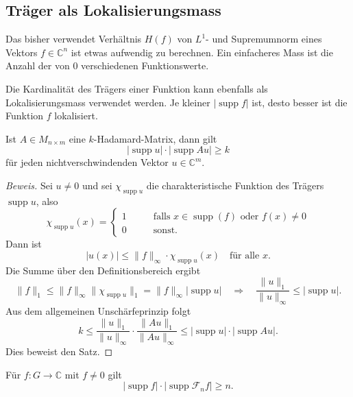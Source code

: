 %
%
\subsection{Träger als Lokalisierungsmass}
Das bisher verwendet Verhältnis $H(f)$ von $L^1$- und Supremumnorm
eines Vektors $f\in\mathbb{C}^n$ ist etwas aufwendig zu berechnen.
Ein einfacheres Mass ist die Anzahl der von $0$ verschiedenen
Funktionswerte.



Die Kardinalität des Trägers einer Funktion kann ebenfalls als
Lokalisierungsmass verwendet werden.
Je kleiner $|\operatorname{supp}f|$ ist, desto besser ist die
Funktion $f$ lokalisiert.

\begin{satz}
\label{buch:diskret:unschaerfe:satz:supportsize}
Ist $A\in M_{n\times m}$ eine $k$-Hadamard-Matrix, dann gilt
\begin{equation}
|\operatorname{supp}u|
\cdot
|\operatorname{supp}Au|
\ge
k
\end{equation}
für jeden nichtverschwindenden Vektor $u\in\mathbb{C}^m$.
\end{satz}

\begin{proof}[Beweis]
Sei $u\ne 0$ und sei $\chi_{\operatorname{supp}u}$ die charakteristische
Funktion des Trägers $\operatorname{supp}u$, also
\[
\chi_{\operatorname{supp}u}(x)
=
\begin{cases}
1&\qquad\text{falls $x\in\operatorname{supp}(f)$ oder $f(x)\ne 0$}\\
0&\qquad\text{sonst.}
\end{cases}
\]
Dann ist
\[
|u(x)|
\le
\|f\|_\infty\cdot \chi_{\operatorname{supp}u}(x)
\quad
\text{für alle $x$.}
\]
Die Summe über den Definitionsbereich ergibt
\[
\|f\|_1
\le
\|f\|_\infty \|\chi_{\operatorname{supp}u}\|_1
=
\|f\|_\infty |\operatorname{supp}u|
\quad\Rightarrow\quad
\frac{\|u\|_1}{\|u\|_\infty} \le |\operatorname{supp}u|.
\]
Aus dem allgemeinen Unschärfeprinzip folgt
\[
k
\le
\frac{\|u\|_1}{\|u\|_\infty}
\cdot
\frac{\|Au\|_1}{\|Au\|_\infty}
\le
|\operatorname{supp}u|
\cdot
|\operatorname{supp}Au|.
\]
Dies beweist den Satz.
\end{proof}

\begin{satz}
\label{buch:diskret:unschaerfe:satz:donoho-stark}
%
Für $f\colon G\to\mathbb{C}$ mit $f\ne 0$ gilt
\[
|\operatorname{supp}f|
\cdot
|\operatorname{supp}\mathscr{F}_nf|
\ge n.
\]
\end{satz}

